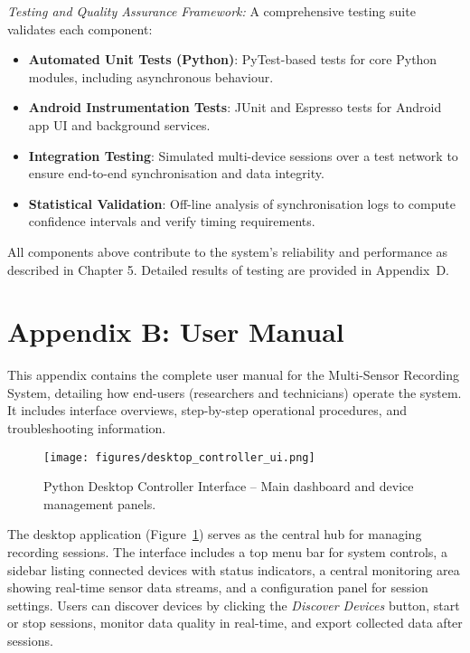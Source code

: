 \documentclass[11pt,a4paper]{report}
\begin{document}
{\emph{Testing and Quality Assurance Framework:} A comprehensive testing suite validates each component:

\begin{itemize}
    \item \textbf{Automated Unit Tests (Python)}: PyTest-based tests for core Python modules, including asynchronous behaviour.
    \item \textbf{Android Instrumentation Tests}: JUnit and Espresso tests for Android app UI and background services.
    \item \textbf{Integration Testing}: Simulated multi-device sessions over a test network to ensure end-to-end synchronisation and data integrity.
    \item \textbf{Statistical Validation}: Off-line analysis of synchronisation logs to compute confidence intervals and verify timing requirements.
\end{itemize}

All components above contribute to the system’s reliability and performance as described in Chapter 5. Detailed results of testing are provided in Appendix~D.

\chapter*{Appendix B: User Manual}

This appendix contains the complete user manual for the Multi-Sensor Recording System, detailing how end-users (researchers and technicians) operate the system. It includes interface overviews, step-by-step operational procedures, and troubleshooting information.

\begin{figure}[h!]
\centering
\texttt{[image: figures/desktop\_controller\_ui.png]}
\caption{Python Desktop Controller Interface – Main dashboard and device management panels.}
\label{fig:desktop-ui}
\end{figure}

The desktop application (Figure~\ref{fig:desktop-ui}) serves as the central hub for managing recording sessions. The interface includes a top menu bar for system controls, a sidebar listing connected devices with status indicators, a central monitoring area showing real-time sensor data streams, and a configuration panel for session settings. Users can discover devices by clicking the \emph{Discover Devices} button, start or stop sessions, monitor data quality in real-time, and export collected data after sessions.

}
\end{document}
